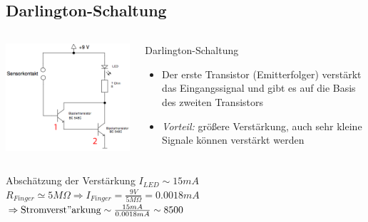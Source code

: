 \documentclass[compress,11pt]{beamer}
\begin{document}
\subsection{Darlington-Schaltung}
\begin{frame}
	\begin{columns}
	\includegraphics[width=\textwidth]{schaltbilder/darlington.png}
	\begin{block}{Darlington-Schaltung}
		\begin{itemize}
		\item Der erste Transistor (Emitterfolger) verstärkt das Eingangssignal und gibt es auf die Basis des zweiten Transistors\\
		
		\item \emph{Vorteil:} größere Verstärkung, 
		auch sehr kleine Signale können verstärkt werden
		\end{itemize}
	\end{block}
	\end{columns}
\end{frame}
\begin{frame}
\begin{block}{Abschätzung der Verstärkung}
$I_{LED}\sim 15mA$\\
$R_{Finger}\simeq 5M\Omega \Rightarrow I_{Finger}=\frac{9V}{5M\Omega}=0.0018 mA$\\
$\Rightarrow \mathrm{Stromverst"arkung} \sim \frac{15mA}{0.0018mA}\sim 8500$
\end{block}
\end{frame}
\end{document}
